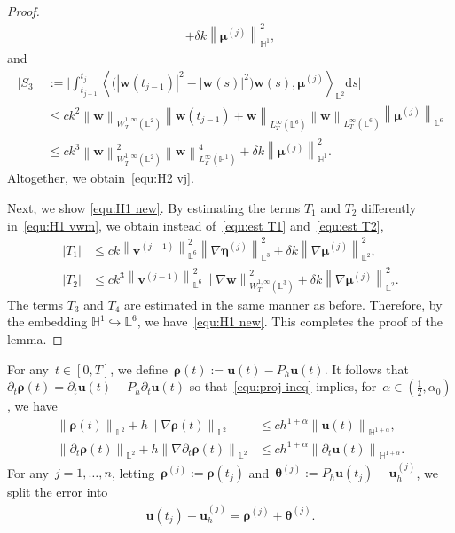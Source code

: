 \documentclass[11pt,reqno]{amsart}
\theoremstyle{definition}
\numberwithin{equation}{section}
\newcommand{\bff}{\boldsymbol}
\newcommand{\bb}{\mathbb}
\newcommand{\ds}{\mathrm{d}s}
\newcommand{\pa}{\partial}
\newcommand{\norm}[2]{\left\|{#1}\right\|_{#2}}
\newcommand{\inpro}[2]{\left\langle#1,#2\right\rangle}
\newcommand{\abs}[1]{\left|{#1}\right|}
\begin{document}
\begin{proof}
\begin{align*}
		+
		\delta k
		\norm{\bff{\mu}^{(j)}}{\bb{H}^1}^2,
	\end{align*}
	and
	\begin{align*} 
		|S_3|
		&:=
		\Big|
		\int_{t_{j-1}}^{t_j} 
		\inpro{\big( |\bff{w}(t_{j-1})|^2 - |\bff{w}(s)|^2 \big)
			\bff{w}(s)}{\bff{\mu}^{(j)}}_{\bb{L}^2} \ds
		\Big|
		\\
		&\le
		c k^2
		\norm{\bff{w}}{W^{1,\infty}_T(\bb{L}^2)} 
		\norm{\bff{w}(t_{j-1})+\bff{w}}{L^\infty_T(\bb{L}^6)} 
		\norm{\bff{w}}{L^\infty_T(\bb{L}^6)} 
		\norm{\bff{\mu}^{(j)}}{\bb{L}^6} 
		\\
		&\le
		c k^3 
		\norm{\bff{w}}{W^{1,\infty}_T(\bb{L}^2)}^2 
		\norm{\bff{w}}{L^{\infty}_T(\bb{H}^1)}^4
		+
		\delta k
		\norm{\bff{\mu}^{(j)}}{\bb{H}^1}^2.
	\end{align*}
	Altogether, we obtain~\eqref{equ:H2 vj}.

    Next, we show \eqref{equ:H1 new}.
    By estimating the terms $T_1$ and $T_2$ differently in~\eqref{equ:H1 vwm}, we obtain instead of~\eqref{equ:est T1} and~\eqref{equ:est T2},
\begin{align*}
	\abs{T_1} &\leq
	ck \norm{\bff{v}^{(j-1)}}{\bb{L}^6}^2 \norm{\nabla \bff{\eta}^{(j)}}{\bb{L}^3}^2 
	+ \delta k\norm{\nabla \bff{\mu}^{(j)}}{\bb{L}^2}^2,
	\\
	\abs{T_2} &\leq
	ck^3 \norm{\bff{v}^{(j-1)}}{\bb{L}^6}^2 \norm{\nabla \bff{w}}{W^{1,\infty}_T(\bb{L}^3)}^2 
	+ \delta k \norm{\nabla \bff{\mu}^{(j)}}{\bb{L}^2}^2.
\end{align*}
    The terms $T_3$ and $T_4$ are estimated in the same manner as before. Therefore, by the embedding $\bb{H}^1 \hookrightarrow \bb{L}^6$, we have~\eqref{equ:H1 new}. This completes the proof of the lemma.
\end{proof}



For any~$t\in[0,T]$, we define~$\bff{\rho}(t) :=
\bff{u}(t)-P_h\bff{u}(t)$. It follows 
that~$\pa_t\bff{\rho}(t) = \pa_t\bff{u}(t)-P_h\pa_t\bff{u}(t)$
so that~\eqref{equ:proj ineq} implies, for~$\alpha\in (\frac12, \alpha_0)$, we have
	\begin{equation}\label{equ:rho rhot}
		\begin{aligned}
			\norm{\bff{\rho}(t)}{\bb{L}^2} 
			+
			h \norm{\nabla\bff{\rho}(t)}{\bb{L}^2}
			&\le
			c h^{1+\alpha} \norm{\bff{u}(t)}{\bb{H}^{1+\alpha}}, 
			\\
			\norm{\partial_t \bff{\rho}(t)}{\bb{L}^2} 
			+
			h \norm{\nabla \partial_t \bff{\rho}(t)}{\bb{L}^2}
			&\le
			c h^{1+\alpha} \norm{\partial_t \bff{u}(t)}{\bb{H}^{1+\alpha}}.
		\end{aligned}
	\end{equation}
For any~$j=1,\ldots,n$, 
letting~$\bff{\rho}^{(j)} := \bff{\rho}(t_j)$ and~$\bff{\theta}^{(j)} := P_h\bff{u}(t_j)-\bff{u}_h^{(j)}$,
we split the error into
\begin{align}\label{equ:error theta rho}
	\bff{u}(t_j)-\bff{u}_h^{(j)}
	=
	\bff{\rho}^{(j)} + \bff{\theta}^{(j)}.
\end{align}
\end{document}
